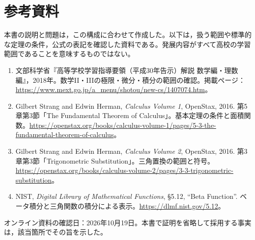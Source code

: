 \chapter*{参考資料}
本書の説明と問題は，この構成に合わせて作成した。以下は，扱う範囲や標準的な定理の条件，公式の表記を確認した資料である。発展内容がすべて高校の学習範囲であることを意味するものではない。
\begin{enumerate}[leftmargin=*]
\item 文部科学省『高等学校学習指導要領（平成30年告示）解説 数学編・理数編』，2018年。数学II・IIIの極限・微分・積分の範囲の確認。掲載ページ：\url{https://www.mext.go.jp/a_menu/shotou/new-cs/1407074.htm}。
\item Gilbert Strang and Edwin Herman, \textit{Calculus Volume 1}, OpenStax, 2016. 第5章第3節「The Fundamental Theorem of Calculus」。基本定理の条件と面積関数。\url{https://openstax.org/books/calculus-volume-1/pages/5-3-the-fundamental-theorem-of-calculus}。
\item Gilbert Strang and Edwin Herman, \textit{Calculus Volume 2}, OpenStax, 2016. 第3章第3節「Trigonometric Substitution」。三角置換の範囲と符号。\url{https://openstax.org/books/calculus-volume-2/pages/3-3-trigonometric-substitution}。
\item NIST, \textit{Digital Library of Mathematical Functions}, \S5.12, ``Beta Function''. ベータ積分と三角関数の積分による表示。\url{https://dlmf.nist.gov/5.12}。
\end{enumerate}
オンライン資料の確認日：2026年10月19日。本書で証明を省略して採用する事実は，該当箇所でその旨を示した。
